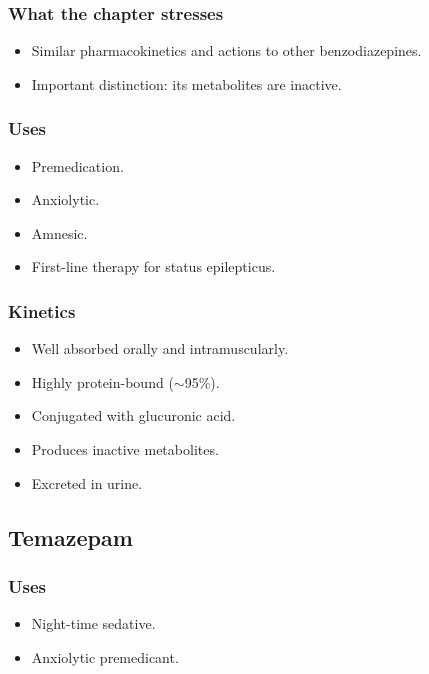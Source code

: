 \documentclass[11pt,a4paper]{article}
\begin{document}
\subsubsection{What the chapter stresses}
\begin{itemize}
  \item Similar pharmacokinetics and actions to other benzodiazepines.
  \item Important distinction: its metabolites are inactive.
\end{itemize}

\subsubsection{Uses}
\begin{itemize}
  \item Premedication.
  \item Anxiolytic.
  \item Amnesic.
  \item First-line therapy for status epilepticus.
\end{itemize}

\subsubsection{Kinetics}
\begin{itemize}
  \item Well absorbed orally and intramuscularly.
  \item Highly protein-bound ($\sim$95\%).
  \item Conjugated with glucuronic acid.
  \item Produces inactive metabolites.
  \item Excreted in urine.
\end{itemize}

\subsection{Temazepam}

\subsubsection{Uses}
\begin{itemize}
  \item Night-time sedative.
  \item Anxiolytic premedicant.
\end{itemize}
\end{document}
